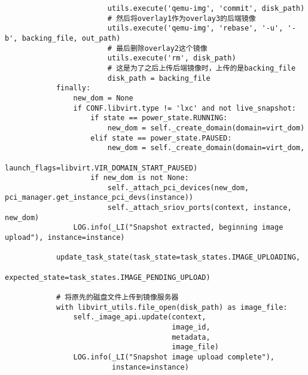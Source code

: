 \documentclass[a4paper,left=1.5cm,right=1.5cm,11pt]{article}
\begin{document}
\begin{lstlisting}
                        utils.execute('qemu-img', 'commit', disk_path)
                        # 然后将overlay1作为overlay3的后端镜像
                        utils.execute('qemu-img', 'rebase', '-u', '-b', backing_file, out_path)
                        # 最后删除overlay2这个镜像
                        utils.execute('rm', disk_path)
                        # 这是为了之后上传后端镜像时，上传的是backing_file
                        disk_path = backing_file
            finally:
                new_dom = None
                if CONF.libvirt.type != 'lxc' and not live_snapshot:
                    if state == power_state.RUNNING:
                        new_dom = self._create_domain(domain=virt_dom)
                    elif state == power_state.PAUSED:
                        new_dom = self._create_domain(domain=virt_dom,
                                launch_flags=libvirt.VIR_DOMAIN_START_PAUSED)
                    if new_dom is not None:
                        self._attach_pci_devices(new_dom, pci_manager.get_instance_pci_devs(instance))
                        self._attach_sriov_ports(context, instance, new_dom)
                LOG.info(_LI("Snapshot extracted, beginning image upload"), instance=instance)
            
            update_task_state(task_state=task_states.IMAGE_UPLOADING, 
                              expected_state=task_states.IMAGE_PENDING_UPLOAD)
            
            # 将原先的磁盘文件上传到镜像服务器
            with libvirt_utils.file_open(disk_path) as image_file:
                self._image_api.update(context,
                                       image_id,
                                       metadata,
                                       image_file)
                LOG.info(_LI("Snapshot image upload complete"),
                         instance=instance) 
    \end{lstlisting}
\end{document}
